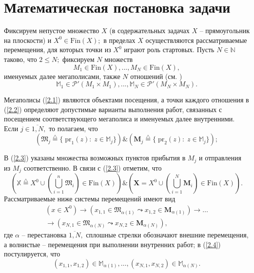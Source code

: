\documentclass[10pt]{SPIIRAS_Proceedings}
\begin{document}
\section{Математическая постановка задачи}

Фиксируем непустое множество $X$
(в содержательных задачах \cite{4}
$X$ -- прямоугольник на плоскости)
и $X^0 \in \mathrm{Fin}(X);$
в пределах $X$ осуществляются рассматриваемые перемещения,
для которых точки из $X^0$ играют роль стартовых.
Пусть $N \in \mathbb{N}$ таково,
что $2 \le N;$
фиксируем $N$ множеств
\begin{equation}\label{2.1}
M_1 \in \mathrm{Fin}(X),...,M_N \in \mathrm{Fin}(X),
\end{equation}
именуемых далее мегаполисами,
также $N$ отношений (см. \cite[гл.II,$\S$4]{15})
\begin{equation}\label{2.2}
\mathbb{M}_1 \in \mathcal{P}'(M_1 \times M_1),...,\mathbb{M}_N \in \mathcal{P}'(M_N \times M_N).
\end{equation}

Мегаполисы (\ref{2.1})
являются объектами посещения,
а точки каждого отношения в (\ref{2.2})
определяют допустимые варианты выполнения работ,
связанных с посещением соответствующего мегаполиса и именуемых далее внутренними.
Если $j \in \overline{1,N},$
то полагаем, что
\begin{equation}\label{2.3}
(\mathfrak{M}_j \stackrel{\triangle}{=}
\{\;\mathrm{pr}_1(z):\;z \in \mathbb{M}_j\})
\& (\mathbf{M}_j \stackrel{\triangle}{=}
\{\;\mathrm{pr}_2(z):\;z \in \mathbb{M}_j\});
\end{equation}

В (\ref{2.3}) указаны множества возможных пунктов прибытия в $M_j$
и отправления из $M_j$ соответственно.
В связи с (\ref{2.3})
отметим, что
$$
(\mathbb{X} \stackrel{\triangle}{=} X^0 \cup
(\bigcup\limits_{i=1}^n \mathfrak{M}_i) \in \mathrm{Fin}(X))
\& (\mathbf{X} = X^0 \cup (\bigcup\limits_{i=1}^N \mathbf{M}_i) \in \mathrm{Fin}(X)).
$$
Рассматриваемые ниже системы перемещений имеют вид
\begin{equation}\label{2.4}
  \begin{aligned}
    (x \in X^0)
    \to
    (x_{1,1} \in \mathfrak{M}_{\alpha(1)} \leadsto x_{1,2} \in \mathbf{M}_{\alpha(1)})
    \to \dots \\
    \to
    (x_{N,1} \in \mathfrak{M}_{\alpha(N)} \leadsto x_{N,2} \in \mathbf{M}_{\alpha(N)}),
  \end{aligned}
\end{equation}
где $\alpha$ -- перестановка $\overline{1,N},$
сплошные стрелки обозначают внешние перемещения,
а волнистые -- перемещения при выполнении внутренних работ;
в (\ref{2.4}) постулируется, что
\begin{equation}\label{2.5}
  (x_{1,1},x_{1,2}) \in \mathbb{M}_{\alpha(1)},
  \dots,
  (x_{N,1},x_{N,2}) \in \mathbb{M}_{\alpha(N)}.
\end{equation}
\end{document}
